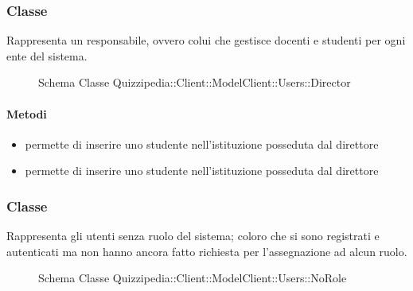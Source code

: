 \subsubsection{Classe }
Rappresenta un responsabile, ovvero colui che gestisce docenti e studenti per ogni ente del sistema.
\begin{figure}[H]
\centering
\noindent{}
\caption[Schema Classe Director]{Schema Classe Quizzipedia::Client::ModelClient::Users::Director}
\end{figure}
\paragraph{Metodi}
\begin{itemize}
\item {}
\newline
permette di inserire uno studente nell'istituzione posseduta dal direttore
\newline
\item {}
\newline
permette di inserire uno studente nell'istituzione posseduta dal direttore
\newline
\end{itemize}
\subsubsection{Classe }
Rappresenta gli utenti senza ruolo del sistema; coloro che si sono registrati e autenticati ma non hanno ancora fatto richiesta per l'assegnazione ad alcun ruolo.
\begin{figure}[H]
\centering
\noindent{}
\caption[Schema Classe NoRole]{Schema Classe Quizzipedia::Client::ModelClient::Users::NoRole}
\end{figure}

